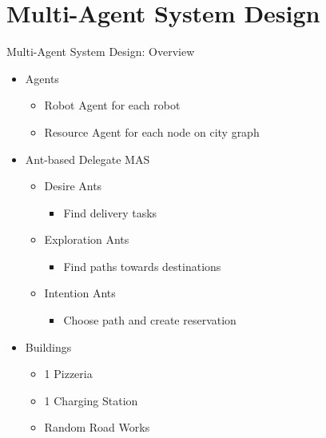 \section{Multi-Agent System Design}

\begin{frame}{Multi-Agent System Design: Overview}
    \begin{itemize}
        \item Agents
            \begin{itemize}
                \item Robot Agent for each robot
                \item Resource Agent for each node on city graph
            \end{itemize}

        \item Ant-based Delegate MAS
            \begin{itemize}
                \item Desire Ants
                \begin{itemize}
                    \item Find delivery tasks
                \end{itemize}

                \item Exploration Ants
                \begin{itemize}
                    \item Find paths towards destinations
                \end{itemize}

                \item Intention Ants
                \begin{itemize}
                    \item Choose path and create reservation
                \end{itemize}
            \end{itemize}

        \item Buildings
            \begin{itemize}
                \item 1 Pizzeria
                \item 1 Charging Station
                \item Random Road Works
            \end{itemize}
    \end{itemize}
\end{frame}

